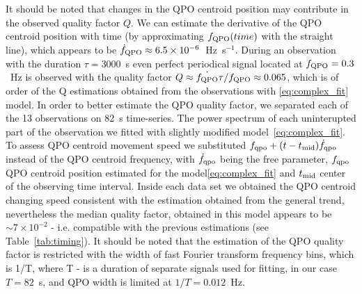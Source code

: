 \documentclass[a4paper,fleqn,usenatbib]{mnras}
\begin{document}
It should be noted that  changes in the QPO centroid position may contribute in the observed quality factor $Q$.
We can estimate the derivative of the QPO centroid position with time (by approximating $f_{\rm QPO}(time)$ with the straight line), which appears to be $\dot{f}_{\rm QPO} \approx 6.5\times10^{-6}$~Hz~s$^{-1}$. 
During an observation with the duration $\tau = 3000$~s even perfect periodical signal located at $f_{\rm QPO}=0.3$~Hz is observed with the quality factor $Q \approx \dot{f_{\rm QPO}}\tau/f_{\rm QPO} \approx 0.065$, which is of order of the Q estimations obtained from the observations with \ref{eq:complex_fit} model.
In order to better estimate the QPO quality factor, we separated each of the 13 observations on 82~s time-series. 
The power spectrum of each uninterupted part of the observation we fitted with slightly modified model~\ref{eq:complex_fit}.
To assess QPO centroid movement speed we substituted $f_{\rm qpo} + (t - t_{\rm mid})\dot{f}_{\rm qpo}$ instead of the QPO centroid frequency, with $\dot{f}_{\rm qpo}$ being the free parameter, $f_{\rm qpo}$ QPO centroid position estimated for the model\ref{eq:complex_fit}  and $t_{\rm mid}$ center of the observing time interval. 
Inside each data set we obtained the QPO centroid changing speed consistent with the estimation obtained from the general trend, nevertheless the median quality factor, obtained in this model appears to be $\sim7\times10^{-2}$ - i.e. compatible with the previous estimations (see Table~\ref{tab:timing}). 
It should be noted that the estimation of the QPO quality factor is restricted with the width of fast Fourier transform frequency bins, which is 1/T, where T - is a duration of separate signals used for fitting, in our case $T=82$~s, and QPO width is limited at $1/T = 0.012$~Hz.
\end{document}
